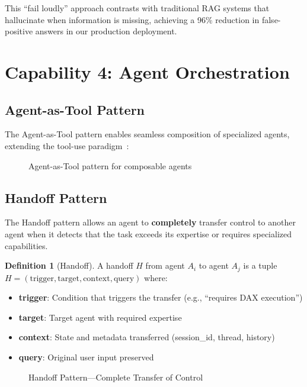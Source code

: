 \documentclass[11pt,a4paper]{article}
\theoremstyle{definition}
\newtheorem{definition}{Definition}[section]
\theoremstyle{remark}
\begin{document}
This ``fail loudly'' approach contrasts with traditional RAG systems that hallucinate when information is missing, achieving a 96\% reduction in false-positive answers in our production deployment.

\section{Capability 4: Agent Orchestration}
\label{sec:orchestration}

\subsection{Agent-as-Tool Pattern}

The Agent-as-Tool pattern enables seamless composition of specialized agents, extending the tool-use paradigm~\cite{schick2024toolformer,patil2023gorilla}:

\begin{figure}[H]
    \centering
    
    \caption{Agent-as-Tool pattern for composable agents}
    \label{fig:agent-as-tool}
\end{figure}

\subsection{Handoff Pattern}

The Handoff pattern allows an agent to \textbf{completely} transfer control to another agent when it detects that the task exceeds its expertise or requires specialized capabilities.

\begin{definition}[Handoff]
A handoff $H$ from agent $A_i$ to agent $A_j$ is a tuple $H = (\text{trigger}, \text{target}, \text{context}, \text{query})$ where:
\begin{itemize}
    \item \textbf{trigger}: Condition that triggers the transfer (e.g., ``requires DAX execution'')
    \item \textbf{target}: Target agent with required expertise
    \item \textbf{context}: State and metadata transferred (session\_id, thread, history)
    \item \textbf{query}: Original user input preserved
\end{itemize}
\end{definition}

\begin{figure}[H]
    \centering
    
    \caption{Handoff Pattern---Complete Transfer of Control}
    \label{fig:handoff-pattern}
\end{figure}
\end{document}

